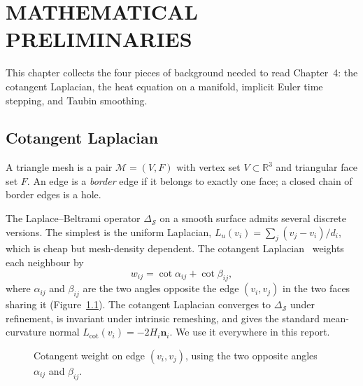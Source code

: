 \chapter{MATHEMATICAL PRELIMINARIES}

This chapter collects the four pieces of background needed to read Chapter~4: the cotangent Laplacian, the heat equation on a manifold, implicit Euler time stepping, and Taubin smoothing.

\section{Cotangent Laplacian}

A triangle mesh is a pair $\mathcal{M} = (V, F)$ with vertex set $V \subset \mathbb{R}^3$ and triangular face set $F$. An edge is a \emph{border} edge if it belongs to exactly one face; a closed chain of border edges is a hole.

The Laplace--Beltrami operator $\Delta_{\mathcal{S}}$ on a smooth surface admits several discrete versions. The simplest is the uniform Laplacian, $L_u(v_i) = \sum_j (v_j - v_i) / d_i$, which is cheap but mesh-density dependent. The cotangent Laplacian~\cite{pinkall1993, meyer2003} weights each neighbour by
\begin{equation}
w_{ij} = \cot \alpha_{ij} + \cot \beta_{ij}, \label{eq:cot}
\end{equation}
where $\alpha_{ij}$ and $\beta_{ij}$ are the two angles opposite the edge $(v_i, v_j)$ in the two faces sharing it (Figure~\ref{fig:cotangent-weights}). The cotangent Laplacian converges to $\Delta_{\mathcal{S}}$ under refinement, is invariant under intrinsic remeshing, and gives the standard mean-curvature normal $L_{\text{cot}}(v_i) = -2 H_i \mathbf{n}_i$. We use it everywhere in this report.

\begin{figure}[H]
    \centering
    \caption{Cotangent weight on edge $(v_i, v_j)$, using the two opposite angles $\alpha_{ij}$ and $\beta_{ij}$.}
    \label{fig:cotangent-weights}
\end{figure}

